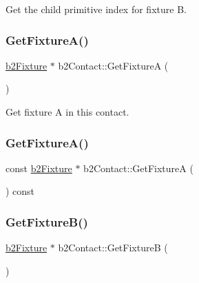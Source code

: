 Get the child primitive index for fixture B. 

\mbox{\label{classb2_contact_a707a3a5a14c2cdd4c6eb7fc648d76037}} 
\subsubsection{\texorpdfstring{GetFixtureA()}{GetFixtureA()}\hspace{0.1cm}{\footnotesize\ttfamily [1/2]}}
{\footnotesize\ttfamily \mbox{\hyperlink{classb2_fixture}{b2\+Fixture}} $\ast$ b2\+Contact\+::\+Get\+FixtureA (\begin{DoxyParamCaption}{ }\end{DoxyParamCaption})\hspace{0.3cm}{\ttfamily [inline]}}



Get fixture A in this contact. 

\mbox{\label{classb2_contact_ad3c9e8c69128efbe03af632c1acc7776}} 
\subsubsection{\texorpdfstring{GetFixtureA()}{GetFixtureA()}\hspace{0.1cm}{\footnotesize\ttfamily [2/2]}}
{\footnotesize\ttfamily const \mbox{\hyperlink{classb2_fixture}{b2\+Fixture}} $\ast$ b2\+Contact\+::\+Get\+FixtureA (\begin{DoxyParamCaption}{ }\end{DoxyParamCaption}) const\hspace{0.3cm}{\ttfamily [inline]}}

\mbox{\label{classb2_contact_a68464fe587d7e6a1f52763e965bb7361}} 
\subsubsection{\texorpdfstring{GetFixtureB()}{GetFixtureB()}\hspace{0.1cm}{\footnotesize\ttfamily [1/2]}}
{\footnotesize\ttfamily \mbox{\hyperlink{classb2_fixture}{b2\+Fixture}} $\ast$ b2\+Contact\+::\+Get\+FixtureB (\begin{DoxyParamCaption}{ }\end{DoxyParamCaption})\hspace{0.3cm}{\ttfamily [inline]}}



